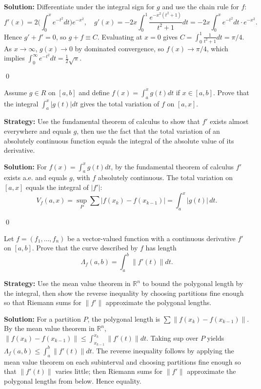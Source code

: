 \bigskip\noindent\textbf{Solution:}
Differentiate under the integral sign for $g$ and use the chain rule for $f$:
\[f'(x)=2\Big(\int_0^x e^{-t^2}dt\Big)e^{-x^2},\quad g'(x)=-2x\int_0^1 \frac{e^{-x^2(t^2+1)}}{t^2+1}dt=-2x\int_0^x e^{-t^2}dt\cdot e^{-x^2}.
\]
Hence $g'+f'=0$, so $g+f\equiv C$. Evaluating at $x=0$ gives $C=\int_0^1\frac{1}{t^2+1}dt=\pi/4$. As $x\to\infty$, $g(x)\to0$ by dominated convergence, so $f(x)\to \pi/4$, which implies $\int_0^\infty e^{-t^2}dt=\tfrac12\sqrt\pi$.




\qed
\begin{problembox}
\begin{problemstatement}
Assume $g \in R$ on $[a, b]$ and define $f(x) = \int_a^x g(t) dt$ if $x \in [a, b]$. Prove that the integral $\int_a^x |g(t)| dt$ gives the total variation of $f$ on $[a, x]$.
\end{problemstatement}
\end{problembox}

\noindent\textbf{Strategy:} Use the fundamental theorem of calculus to show that $f'$ exists almost everywhere and equals $g$, then use the fact that the total variation of an absolutely continuous function equals the integral of the absolute value of its derivative.

\bigskip\noindent\textbf{Solution:}
For $f(x)=\int_a^x g(t)dt$, by the fundamental theorem of calculus $f'$ exists a.e. and equals $g$, with $f$ absolutely continuous. The total variation on $[a,x]$ equals the integral of $|f'|$:
\[V_f(a,x)=\sup_{P}\sum|f(x_k)-f(x_{k-1})|=\int_a^x |g(t)|\,dt.
\]




\qed
\begin{problembox}
\begin{problemstatement}
Let $f = (f_1, \ldots, f_n)$ be a vector-valued function with a continuous derivative $f'$ on $[a, b]$. Prove that the curve described by $f$ has length 
\[\Lambda_f(a, b) = \int_a^b \|f'(t)\| dt.\]
\end{problemstatement}
\end{problembox}

\noindent\textbf{Strategy:} Use the mean value theorem in $\mathbb{R}^n$ to bound the polygonal length by the integral, then show the reverse inequality by choosing partitions fine enough so that Riemann sums for $\|f'\|$ approximate the polygonal lengths.

\bigskip\noindent\textbf{Solution:}
For a partition $P$, the polygonal length is $\sum\|f(x_k)-f(x_{k-1})\|$. By the mean value theorem in $\mathbb{R}^n$, $\|f(x_k)-f(x_{k-1})\|\le \int_{x_{k-1}}^{x_k}\|f'(t)\|dt$. Taking sup over $P$ yields $\Lambda_f(a,b)\le\int_a^b\|f'(t)\|dt$. The reverse inequality follows by applying the mean value theorem on each subinterval and choosing partitions fine enough so that $\|f'(t)\|$ varies little; then Riemann sums for $\|f'\|$ approximate the polygonal lengths from below. Hence equality.




